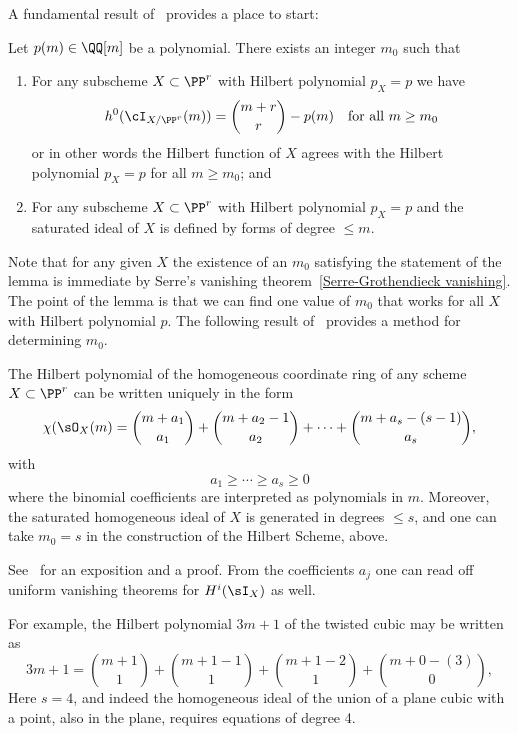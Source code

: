 A fundamental result of~\cite{Matsusaka} provides a place to start:

\begin{lemma}\label{matsusaka}
Let $p(m) \in \QQ[m]$ be a polynomial. There exists an integer $m_0$ such that

\begin{enumerate}  

\item For any subscheme $X \subset \PP^r$ with Hilbert polynomial $p_X = p$ we have
$$
h^0(\cI_{X/\PP^r}(m)) = \binom{m+r}{r} - p(m) \quad \text{for all } m \geq m_0
$$
or in other words the Hilbert function of $X$ agrees with the Hilbert polynomial $p_X = p$ for all $m \geq m_0$; and

\item For any subscheme $X \subset \PP^r$ with Hilbert polynomial $p_X = p$ and
the saturated ideal of $X$ is defined by forms of degree $\leq m$.
\end{enumerate}
\end{lemma}



Note that  for any given $X$ the existence of an $m_0$ satisfying the statement of the lemma is immediate by Serre's vanishing theorem~\ref{Serre-Grothendieck vanishing}. The point of the lemma is that we can find one value of $m_0$ that works for all $X$ with Hilbert polynomial $p$. The following result of~\cite{Gotzmann} provides a method for determining $m_0$. 

\begin{theorem}
The Hilbert polynomial  of the homogeneous coordinate ring of any scheme $X\subset \PP^r$ can be written uniquely in the form
$$
\chi(\sO_X(m) = {m+a_1\choose a_1}+ {m+a_2 -1\choose a_2}+ \cdots+{m+a_s -(s-1)\choose a_s},
$$
with 
$$
a_1\geq \cdots \geq a_s \geq 0
$$
where the binomial coefficients are interpreted as polynomials in $m$. Moreover, the saturated homogeneous ideal of $X$ is
 generated in degrees $\leq s$, and one can take $m_0 = s$ in the construction of the Hilbert Scheme, above.
\end{theorem}
See~\cite{MR1023391} %
for an exposition and a proof. From the coefficients $a_j$ one can read off uniform vanishing theorems for $H^i(\sI_X)$
 as well.
 
 For example, the Hilbert polynomial $3m+1$ of the twisted cubic may be written as
 $$
 3m+1 =  {m+1\choose 1}+ {m+1 -1\choose 1}+{m+1 -2\choose 1}+{m+0 -(3)\choose 0},
 $$
 Here $s=4$, and indeed the homogeneous ideal of the union of a plane cubic with a point, also in the plane,
 requires equations of degree 4.
 
